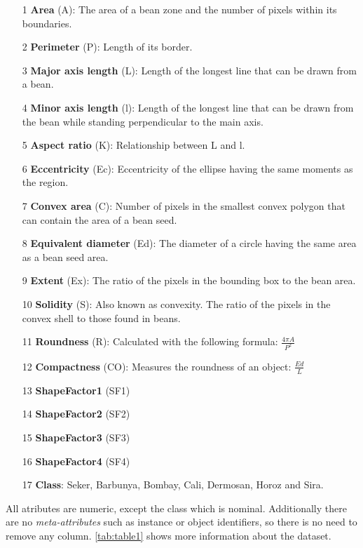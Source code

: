 \documentclass[a4paper,11pt]{article}
\begin{document}
\begin{itemize}
\setlength\itemsep{-1ex}
\item[1] \textbf{Area} (A): The area of a bean zone and the number of pixels within its boundaries.
\item[2] \textbf{Perimeter} (P): Length of its border.
\item[3] \textbf{Major axis length} (L): Length of the longest line that can be drawn from a bean.
\item[4] \textbf{Minor axis length} (l): Length of the longest line that can be drawn from the bean while standing perpendicular to the main axis.
\item[5] \textbf{Aspect ratio} (K): Relationship between L and l.
\item[6] \textbf{Eccentricity} (Ec): Eccentricity of the ellipse having the same moments as the region.
\item[7] \textbf{Convex area} (C): Number of pixels in the smallest convex polygon that can contain the area of a bean seed.
\item[8] \textbf{Equivalent diameter} (Ed): The diameter of a circle having the same area as a bean seed area.
\item[9] \textbf{Extent} (Ex): The ratio of the pixels in the bounding box to the bean area.
\item[10] \textbf{Solidity} (S): Also known as convexity. The ratio of the pixels in the convex shell to those found in beans.
\item[11] \textbf{Roundness} (R): Calculated with the following formula: $\frac{4\pi A}{P^2}$
\item[12] \textbf{Compactness} (CO): Measures the roundness of an object: $\frac{Ed}{L}$
\item[13] \textbf{ShapeFactor1} (SF1)
\item[14] \textbf{ShapeFactor2} (SF2)
\item[15] \textbf{ShapeFactor3} (SF3)
\item[16] \textbf{ShapeFactor4} (SF4)
\item[17] \textbf{Class}: Seker, Barbunya, Bombay, Cali, Dermosan, Horoz and Sira.
\end{itemize}

All atributes are numeric, except the class which is nominal. Additionally there are no \textit{meta-attributes} such as instance or object identifiers, so there is no need to remove any column. \autoref{tab:table1} shows more information about the dataset.
\end{document}
